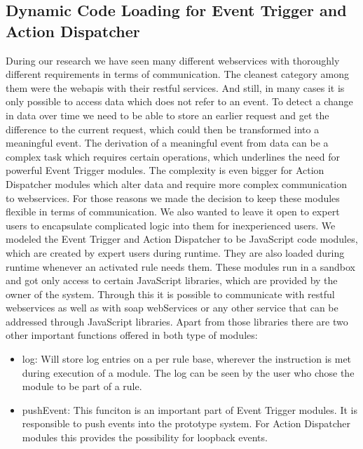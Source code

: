\subsection{Dynamic Code Loading for Event Trigger and Action Dispatcher}
During our research we have seen many different \textrm{\glspl{webservice}} with thoroughly different requirements in terms of communication.
The cleanest category among them were the \textrm{\glspl{webapi}} with their \textrm{\acrshort{rest}}ful services.
And still, in many cases it is only possible to access data which does not refer to an event.
To detect a change in data over time we need to be able to store an earlier request and get the difference to the current request, which could then be transformed into a meaningful event.
The derivation of a meaningful event from data can be a complex task which requires certain operations, which underlines the need for powerful \textrm{Event Trigger} modules.
The complexity is even bigger for \textrm{Action Dispatcher} modules which alter data and require more complex communication to \textrm{\glspl{webservice}}.
For those reasons we made the decision to keep these modules flexible in terms of communication.
We also wanted to leave it open to expert users to encapsulate complicated logic into them for inexperienced users.
We modeled the \textrm{Event Trigger} and \textrm{Action Dispatcher} to be \textrm{JavaScript} code modules, which are created by expert users during runtime.
They are also loaded during runtime whenever an activated rule needs them.
These modules run in a sandbox and got only access to certain \textrm{JavaScript} libraries, which are provided by the owner of the system.
Through this it is possible to communicate with \textrm{\acrshort{rest}}ful \textrm{\glspl{webservice}} as well as with \textrm{\acrshort{soap}} \textrm{\glspl{webService}} or any other service that can be addressed through \textrm{JavaScript} libraries. 
Apart from those libraries there are two other important functions offered in both type of modules:
\begin{itemize}
	\item \textrm{log}: Will store log entries on a per rule base, wherever the instruction is met during execution of a module.
	The log can be seen by the user who chose the module to be part of a rule.
	\item \textrm{pushEvent}: This funciton is an important part of \textrm{Event Trigger} modules.
	It is responsible to push events into the prototype system. For \textrm{Action Dispatcher} modules this provides the possibility for loopback events.
\end{itemize}
